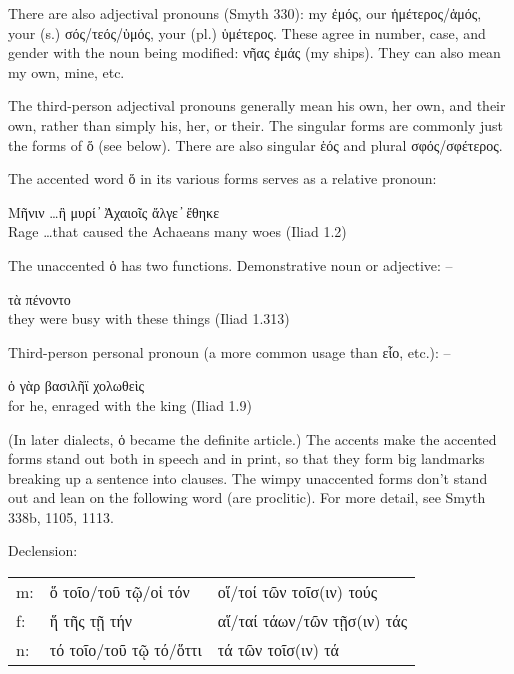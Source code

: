 \begin{small}
There are also adjectival pronouns (Smyth 330): my ἐμός, our ἡμέτερος/ἁμός,
your (s.) σός/τεός/ὑμός, your (pl.) ὑμέτερος. These agree in number, case, and gender with the noun
being modified: νῆας ἐμάς (my ships). They can also mean my own, mine, etc.

The third-person adjectival pronouns generally mean his
own, her own, and their own, rather than simply his, her, or their. The singular forms are
commonly just the forms of ὅ (see below). There are also singular ἑός and plural σφός/σφέτερος.




The accented word ὅ in its various forms serves as a relative pronoun:

Μῆνιν \ldots ἣ μυρί ̓ Ἀχαιοῖς ἄλγε ̓ ἔθηκε\\
Rage \ldots that caused the Achaeans many woes (Iliad 1.2)

The unaccented ὁ has two functions. Demonstrative noun or adjective: --

τὰ πένοντο\\
they were busy with these things (Iliad 1.313)

Third-person personal pronoun (a more common usage than εἷο, etc.): --

ὁ γὰρ βασιλῆϊ χολωθεὶς\\
for he, enraged with the king (Iliad 1.9)

(In later dialects, ὁ became the definite article.) The accents make the accented forms stand out both in speech
and in print, so that they form big landmarks breaking up a sentence into clauses. The wimpy unaccented forms
don't stand out and lean on the following word (are proclitic). For more detail, see Smyth 338b, 1105, 1113.

Declension:


\begin{tabular}{lll}
m: & ὅ τοῖο/τοῦ τῷ/οἱ τόν & οἵ/τοί τῶν τοῖσ(ιν) τούς \\
f: & ἥ τῆς τῇ τήν & αἵ/ταί τάων/τῶν τῇσ(ιν) τάς \\
n: & τό τοῖο/τοῦ τῷ τό/ὅττι & τά τῶν τοῖσ(ιν) τά \\
\end{tabular}


\end{small}
